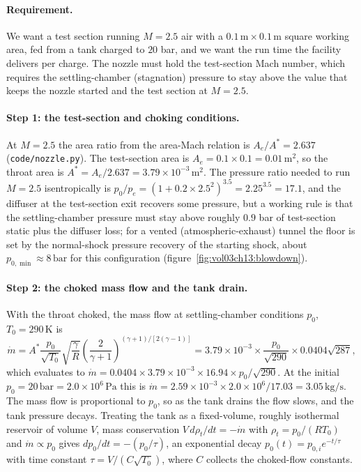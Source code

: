 \paragraph{Requirement.} We want a test section running $M = 2.5$ air
with a $0.1\,\si{\meter}\times 0.1\,\si{\meter}$ square working area,
fed from a tank charged to $20$ bar, and we want the run time the
facility delivers per charge. The nozzle must hold the test-section
Mach number, which requires the settling-chamber (stagnation) pressure
to stay above the value that keeps the nozzle started and the test
section at $M = 2.5$.

\paragraph{Step 1: the test-section and choking conditions.} At
$M = 2.5$ the area ratio from the area-Mach relation is
$A_e/A^* = 2.637$ (\texttt{code/nozzle.py}). The test-section area is
$A_e = 0.1\times 0.1 = 0.01\,\si{\meter}^2$, so the throat area is
$A^* = A_e/2.637 = 3.79\times 10^{-3}\,\si{\meter}^2$. The pressure
ratio needed to run $M = 2.5$ isentropically is
$p_0/p_e = (1 + 0.2\times 2.5^2)^{3.5} = 2.25^{3.5} = 17.1$, and the
diffuser at the test-section exit recovers some pressure, but a working
rule is that the settling-chamber pressure must stay above roughly
$0.9$ bar of test-section static plus the diffuser loss; for a vented
(atmospheric-exhaust) tunnel the floor is set by the normal-shock
pressure recovery of the starting shock, about $p_{0,\min}\approx
8\,\text{bar}$ for this configuration
(figure~\ref{fig:vol03ch13:blowdown}).



\paragraph{Step 2: the choked mass flow and the tank drain.} With the
throat choked, the mass flow at settling-chamber conditions
$p_0$, $T_0 = 290\,\si{\kelvin}$ is
\[
\dot m = A^* \frac{p_0}{\sqrt{T_0}}\sqrt{\frac{\gamma}{R}}
\left(\frac{2}{\gamma + 1}\right)^{(\gamma + 1)/[2(\gamma - 1)]}
= 3.79\times 10^{-3}\times \frac{p_0}{\sqrt{290}}\times 0.0404
\sqrt{287},
\]
which evaluates to $\dot m = 0.0404\times 3.79\times 10^{-3}
\times 16.94 \times p_0/\sqrt{290}$. At the initial $p_0 = 20\,\text{bar}
= 2.0\times 10^6\,\text{Pa}$ this is $\dot m = 2.59\times 10^{-3}
\times 2.0\times 10^6/17.03 = 3.05\,\si{\kilogram\per\second}$. The
mass flow is proportional to $p_0$, so as the tank drains the flow
slows, and the tank pressure decays. Treating the tank as a
fixed-volume, roughly isothermal reservoir of volume $V$, mass
conservation $V\,d\rho_t/dt = -\dot m$ with $\rho_t = p_0/(R T_0)$ and
$\dot m \propto p_0$ gives $dp_0/dt = -(p_0/\tau)$, an exponential
decay $p_0(t) = p_{0,i}e^{-t/\tau}$ with time constant $\tau = V/(C
\sqrt{T_0})$, where $C$ collects the choked-flow constants.

